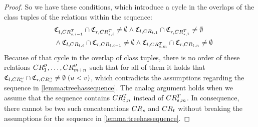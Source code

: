 \begin{proof}
    So we have these conditions, which introduce a cycle in the overlaps of the class tuples of the relations within the sequence:
    \begin{align*}
        \formulaskip &
        \classtuple{C}{l,\consistencyrelation{CR^T}{s,i-1}} \cap \classtuple{C}{r,\consistencyrelation{CR^T}{s,i}} \neq \emptyset %
        \land
        \classtuple{C}{l,\consistencyrelation{CR}{t,1}} \cap \classtuple{C}{r,\consistencyrelation{CR^T}{s,1}} \neq \emptyset\\
        & 
        \land 
        \classtuple{C}{l,\consistencyrelation{CR}{t,i}} \cap \classtuple{C}{r,\consistencyrelation{CR}{t,i-1}} \neq \emptyset %
        \land
        \classtuple{C}{l,\consistencyrelation{CR^T}{s,m}} \cap \classtuple{C}{r,\consistencyrelation{CR}{t,n}} \neq \emptyset
    \end{align*}
    Because of that cycle in the overlap of class tuples, there is no order of these relations $CR''_{1}, \dots, CR''_{m+n}$ such that for all of them it holds that $\mathfrak{C}_{l,CR''_{u}} \cap \mathfrak{C}_{r,CR''_{v}} \neq \emptyset\; (u < v)$, which contradicts the assumptions regarding the sequence in \autoref{lemma:treehassequence}.
    The analog argument holds when we assume that the sequence contains $CR^T_{t,n}$ instead of $CR^T_{s,m}$.
    In consequence, there cannot be two such concatenations $CR_{s}$ and $CR_{t}$ without breaking the assumptions for the sequence in \autoref{lemma:treehassequence}.
\end{proof}

